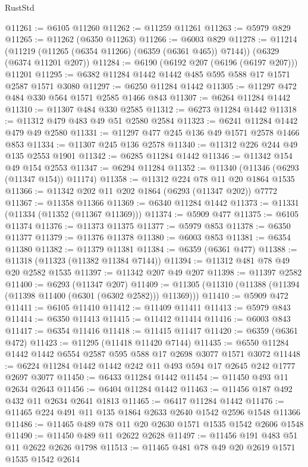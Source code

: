 \begin{lexlean}{RustStd}
\begin{coremodule}
{{@11261 := @6105 @11260
@11262 := @11259 @11261
@11263 := @5979 @829
@11265 := @11262 (@6350 @11263)
@11266 := @6003 @829
@11278 := @11214
    (@11219 (@11265 (@6354 @11266) (@6359 (@6361 @465)) @7144))
    (@6329 (@6374 @11201 @207))
@11284 := @6190 (@6192 @207 (@6196 (@6197 @207))) @11201
@11295 := @6382 @11284 @1442 @1442 @485 @595 @588 @17 @1571 @2587 @1571 @3080
@11297 := @6250 @11284 @1442
@11305 := @11297 @472 @484 @330 @564 @1571 @2585 @1466 @843
@11307 := @6264 @11284 @1442
@11310 := @11307 @484 @330 @2585
@11312 := @6273 @11284 @1442
@11318 := @11312 @479 @483 @49 @51 @2580 @2584
@11323 := @6241 @11284 @1442 @479 @49 @2580
@11331 := @11297 @477 @245 @136 @49 @1571 @2578 @1466 @853
@11334 := @11307 @245 @136 @2578
@11340 := @11312 @226 @244 @49 @135 @2553 @1901
@11342 := @6285 @11284 @1442
@11346 := @11342 @154 @49 @154 @2553
@11347 := @6294 @11284
@11352 := @11340 (@11346 (@6293 (@11347 @154)) @11174)
@11358 := @11312 @224 @78 @11 @20 @1864 @1535
@11366 := @11342 @202 @11 @202 @1864 (@6293 (@11347 @202)) @7772
@11367 := @11358 @11366
@11369 := @6340 @11284 @1442
@11373 := @11331 (@11334 (@11352 (@11367 @11369)))
@11374 := @5909 @477
@11375 := @6105 @11374
@11376 := @11373 @11375
@11377 := @5979 @853
@11378 := @6350 @11377
@11379 := @11376 @11378
@11380 := @6003 @853
@11381 := @6354 @11380
@11382 := @11379 @11381
@11384 := @6359 (@6361 @477)
@11388 := @11318 (@11323 (@11382 @11384 @7144))
@11394 := @11312 @481 @78 @49 @20 @2582 @1535
@11397 := @11342 @207 @49 @207
@11398 := @11397 @2582
@11400 := @6293 (@11347 @207)
@11409 := @11305 (@11310 (@11388 (@11394 (@11398 @11400 (@6301 (@6302 @2582))) @11369)))
@11410 := @5909 @472
@11411 := @6105 @11410
@11412 := @11409 @11411
@11413 := @5979 @843
@11414 := @6350 @11413
@11415 := @11412 @11414
@11416 := @6003 @843
@11417 := @6354 @11416
@11418 := @11415 @11417
@11420 := @6359 (@6361 @472)
@11423 := @11295 (@11418 @11420 @7144)
@11435 := @6550 @11284 @1442 @1442 @6554 @2587 @595 @588 @17 @2698 @3077 @1571 @3072
@11448 := @6224 @11284 @1442 @1442 @242 @11 @493 @594 @17 @2645 @242 @1777 @2697 @3077
@11450 := @6433 @11284 @1442
@11454 := @11450 @493 @11 @2634 @2643
@11456 := @6404 @11284 @1442
@11463 := @11456 @187 @492 @432 @11 @2634 @2641 @1813
@11465 := @6417 @11284 @1442
@11476 := @11465 @224 @491 @11 @135 @1864 @2633 @2640 @1542 @2596 @1548 @11366
@11486 := @11465 @489 @78 @11 @20 @2630 @1571 @1535 @1542 @2606 @1548
@11490 := @11450 @489 @11 @2622 @2628
@11497 := @11456 @191 @483 @51 @11 @2622 @2626 @1798
@11513 := @11465
    @481
    @78
    @49
    @20
    @2619
    @1571
    @1535
    @1542
    @2614
}}
\end{coremodule}
\end{lexlean}
